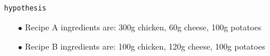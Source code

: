 


{\verb|hypothesis|}


\begin{enumerate}
\item[$\bullet$] Recipe A ingredients are: 300g chicken, 60g cheese, 100g potatoes
\item[$\bullet$] Recipe B ingredients are: 100g chicken, 120g cheese, 100g potatoes
\end{enumerate}



